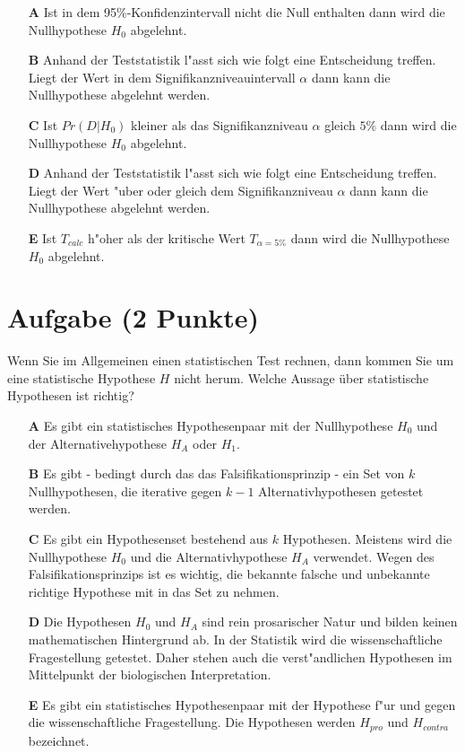 \documentclass[a4paper, 9pt]{scrartcl}\usepackage[]{graphicx}\usepackage[]{xcolor}
\begin{document}
\begin{enumerate}
\item [\textbf{A} \msquare] Ist in dem 95\%-Konfidenzintervall nicht die Null enthalten dann wird die Nullhypothese $H_0$ abgelehnt.
\item [\textbf{B} \msquare] Anhand der Teststatistik l{"a}sst sich wie folgt eine Entscheidung treffen. Liegt der Wert in dem Signifikanzniveauintervall $\alpha$ dann kann die Nullhypothese abgelehnt werden.
\item [\textbf{C} \msquare] Ist $Pr(D|H_0)$ kleiner als das Signifikanzniveau $\alpha$ gleich $5\%$ dann wird die Nullhypothese $H_0$ abgelehnt.
\item [\textbf{D} \msquare] Anhand der Teststatistik l{"a}sst sich wie folgt eine Entscheidung treffen. Liegt der Wert {"u}ber oder gleich dem Signifikanzniveau $\alpha$ dann kann die Nullhypothese abgelehnt werden.
\item [\textbf{E} \msquare] Ist $T_{calc}$ h{"o}her als der kritische Wert $T_{\alpha = 5\%}$ dann wird die Nullhypothese $H_0$ abgelehnt.
\end{enumerate}

\section{Aufgabe \hfill (2 Punkte)}

Wenn Sie im Allgemeinen einen statistischen Test rechnen, dann kommen Sie
um eine statistische Hypothese $H$ nicht herum. Welche Aussage {\"u}ber
statistische Hypothesen ist richtig?



\begin{enumerate}
\item [\textbf{A} \msquare] Es gibt ein statistisches Hypothesenpaar mit der Nullhypothese $H_0$ und der Alternativehypothese $H_A$ oder $H_1$.
\item [\textbf{B} \msquare] Es gibt - bedingt durch das das Falsifikationsprinzip - ein Set von $k$ Nullhypothesen, die iterative gegen $k-1$ Alternativhypothesen getestet werden.
\item [\textbf{C} \msquare] Es gibt ein Hypothesenset bestehend aus $k$ Hypothesen. Meistens wird die Nullhypothese $H_0$ und die Alternativhypothese $H_A$ verwendet. Wegen des Falsifikationsprinzips ist es wichtig, die bekannte falsche und unbekannte richtige Hypothese mit in das Set zu nehmen.
\item [\textbf{D} \msquare] Die Hypothesen $H_0$ und $H_A$ sind rein prosarischer Natur und bilden keinen mathematischen Hintergrund ab. In der Statistik wird die wissenschaftliche Fragestellung getestet. Daher stehen auch die verst{"a}ndlichen Hypothesen im Mittelpunkt der biologischen Interpretation.
\item [\textbf{E} \msquare] Es gibt ein statistisches Hypothesenpaar mit der Hypothese f{"u}r und gegen die wissenschaftliche Fragestellung. Die Hypothesen werden $H_{pro}$ und $H_{contra}$ bezeichnet.
\end{enumerate}
\end{document}
